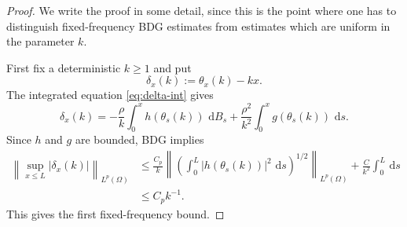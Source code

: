 \documentclass[11pt]{article}
\newcommand{\dd}{\,\mathrm d}
\begin{document}
\begin{proof}
We write the proof in some detail, since this is the point where one has to distinguish fixed-frequency BDG estimates from estimates which are uniform in the parameter $k$.

First fix a deterministic $k\ge1$ and put
\[
    \delta_x(k):=\theta_x(k)-kx .
\]
The integrated equation \eqref{eq:delta-int} gives
\[
    \delta_x(k)
    =-\frac{\rho}{k}\int_0^x h(\theta_s(k))\,\dd B_s
      +\frac{\rho^2}{k^2}\int_0^x g(\theta_s(k))\,\dd s .
\]
Since $h$ and $g$ are bounded, BDG implies
\[
\begin{aligned}
    \left\|\sup_{x\le L}|\delta_x(k)|\right\|_{L^p(\Omega)}
    &\le \frac{C_p}{k}
       \left\|\left(\int_0^L |h(\theta_s(k))|^2\,\dd s\right)^{1/2}\right\|_{L^p(\Omega)}
       +\frac{C}{k^2}\int_0^L\dd s  \\
    &\le C_p k^{-1}.
\end{aligned}
\]
This gives the first fixed-frequency bound.


\end{proof}
\end{document}
